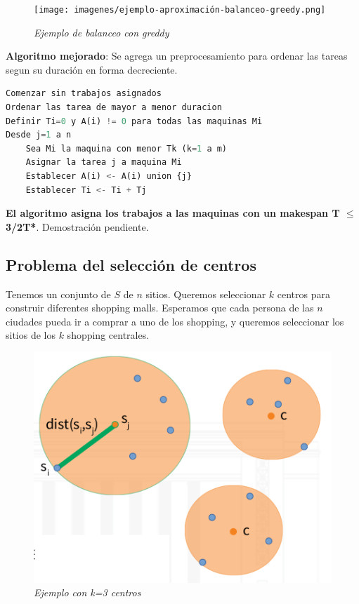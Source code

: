 \documentclass{article}
\begin{document}
\begin{figure}[h!]
    \begin{center} 
    \texttt{[image: imagenes/ejemplo-aproximación-balanceo-greedy.png]}
    \caption{\small \sl Ejemplo de balanceo con greddy} 
    \end{center}
\end{figure}

\textbf{Algoritmo mejorado}: Se agrega un preprocesamiento para ordenar las tareas segun su duración 
en forma decreciente.

\begin{lstlisting}[language=Python, caption=Algoritmo de aproximación greedy mejorado]
Comenzar sin trabajos asignados
Ordenar las tarea de mayor a menor duracion
Definir Ti=0 y A(i) != 0 para todas las maquinas Mi
Desde j=1 a n
    Sea Mi la maquina con menor Tk (k=1 a m)
    Asignar la tarea j a maquina Mi
    Establecer A(i) <- A(i) union {j}
    Establecer Ti <- Ti + Tj

\end{lstlisting}    

\textbf{El algoritmo asigna los trabajos a las maquinas con un makespan T \(\leq\) 3/2T*}. Demostración pendiente.



\newpage
\subsection{Problema del selección de centros}

Tenemos un conjunto de \(S\) de \(n\) sitios. Queremos seleccionar \(k\) centros para construir 
diferentes shopping malls. Esperamos que cada persona de las \(n\) ciudades pueda ir a comprar a 
uno de los shopping, y queremos seleccionar los sitios de los \(k\) shopping centrales.

\begin{figure}[h!]
    \begin{center} 
    \includegraphics[width=\linewidth]{imagenes/problema-aproximacion-centros.png}
    \caption{\small \sl Ejemplo con k=3 centros} 
    \end{center}
\end{figure}
\end{document}

